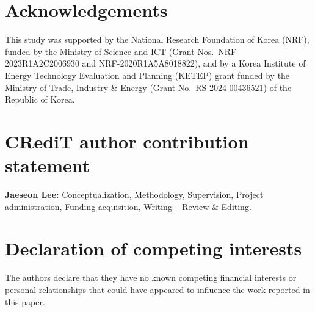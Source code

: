 \documentclass[review,1p,12pt,a4paper]{elsarticle}
\begin{document}
\section*{Acknowledgements}
This study was supported by the National Research Foundation of Korea (NRF),
funded by the Ministry of Science and ICT (Grant Nos.\ NRF-2023R1A2C2006930 and
NRF-2020R1A5A8018822), and by a Korea Institute of Energy Technology Evaluation
and Planning (KETEP) grant funded by the Ministry of Trade, Industry \& Energy
(Grant No.\ RS-2024-00436521) of the Republic of Korea.

\section*{CRediT author contribution statement}
\textbf{Jaeseon Lee:} Conceptualization, Methodology, Supervision, Project
administration, Funding acquisition, Writing -- Review \& Editing.

\section*{Declaration of competing interests}
The authors declare that they have no known competing financial
interests or personal relationships that could have appeared to
influence the work reported in this paper.


\end{document}
